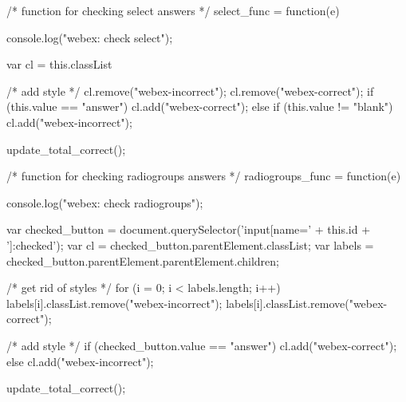 \documentclass[
  ignorenonframetext,
]{beamer}
\begin{document}
/* function for checking select answers */
select_func = function(e) {
  console.log("webex: check select");

  var cl = this.classList

  /* add style */
  cl.remove("webex-incorrect");
  cl.remove("webex-correct");
  if (this.value == "answer") {
    cl.add("webex-correct");
  } else if (this.value != "blank") {
    cl.add("webex-incorrect");
  }

  update_total_correct();
}

/* function for checking radiogroups answers */
radiogroups_func = function(e) {
  console.log("webex: check radiogroups");

  var checked_button = document.querySelector('input[name=' + this.id + ']:checked');
  var cl = checked_button.parentElement.classList;
  var labels = checked_button.parentElement.parentElement.children;

  /* get rid of styles */
  for (i = 0; i < labels.length; i++) {
    labels[i].classList.remove("webex-incorrect");
    labels[i].classList.remove("webex-correct");
  }

  /* add style */
  if (checked_button.value == "answer") {
    cl.add("webex-correct");
  } else {
    cl.add("webex-incorrect");
  }

  update_total_correct();
}
\end{document}
